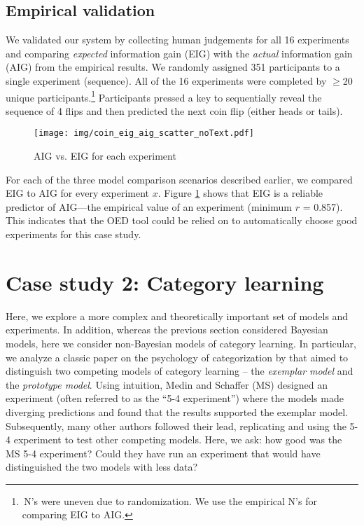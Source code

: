 \documentclass[10pt,letterpaper]{article}
\begin{document}
\subsection{Empirical validation}
We validated our system by collecting human judgements for all 16 experiments and comparing \emph{expected} information gain (EIG) with the \emph{actual} information gain (AIG) from the empirical results.
We randomly assigned 351 participants to a single experiment (sequence).
All of the 16 experiments were completed by $\geq$20 unique participants.\footnote{\,N's were uneven due to randomization. We use the empirical N's for comparing EIG to AIG.}
Participants pressed a key to sequentially reveal the sequence of 4 flips and then predicted the next coin flip (either heads or tails).

\begin{figure}[t]
 \texttt{[image: img/coin\_eig\_aig\_scatter\_noText.pdf]}
 \caption{AIG vs. EIG for each experiment}
  \label{fig:aig_vs_eig}
\end{figure}

For each of the three model comparison scenarios described earlier, we compared EIG to AIG for every experiment $x$.
Figure \ref{fig:aig_vs_eig} shows that EIG is a reliable predictor of AIG---the empirical value of an experiment (minimum $r$ = 0.857). This indicates that the OED tool could be relied on to automatically choose good experiments for this case study.

\section{Case study 2: Category learning}

Here, we explore a more complex and theoretically important set of models and experiments.
In addition, whereas the previous section considered Bayesian models, here we consider non-Bayesian models of category learning.
In particular, we analyze a classic paper on the psychology of categorization by \cite{medin78:pr} that aimed to distinguish two competing models of category learning -- the \emph{exemplar model} and the \emph{prototype model}.
Using intuition, Medin and Schaffer (MS) designed an experiment (often referred to as the ``5-4 experiment'') where the models made diverging predictions and found that the results supported the exemplar model.
Subsequently, many other authors followed their lead, replicating and using the 5-4 experiment to test other competing models.
Here, we ask: how good was the MS 5-4 experiment?
Could they have run an experiment that would have distinguished the two models with less data?
\end{document}
